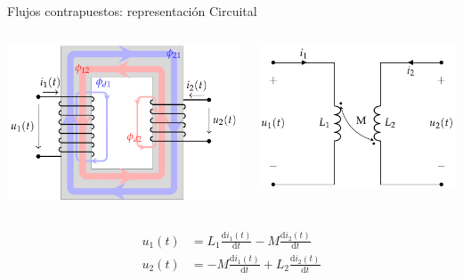 \documentclass[aspectratio=169, usenames,svgnames,dvipsnames]{beamer}
\begin{document}
\begin{frame}[label={sec:org591393b}]{Flujos contrapuestos: representación Circuital}
\begin{columns}
\begin{column}{0.5\columnwidth}
\begin{center}
\includegraphics[height=0.45\textheight]{../figs/acoplamientoTikz_opuesto.pdf}
\end{center}
\end{column}

\begin{column}{0.5\columnwidth}
\begin{center}
\includegraphics[height=0.45\textheight]{../figs/acoplamiento_circuito_opuesto.pdf}
\end{center}
\end{column}
\end{columns}
\begin{align*}
  u_1(t) &= L_1 \frac{\mathrm{d}i_1(t)}{\mathrm{d}t} - M \frac{\mathrm{d}i_2(t)}{\mathrm{d}t}\\
  u_2(t) &= - M \frac{\mathrm{d}i_1(t)}{\mathrm{d}t} + L_2 \frac{\mathrm{d}i_2(t)}{\mathrm{d}t}
\end{align*}
\end{frame}
\end{document}
